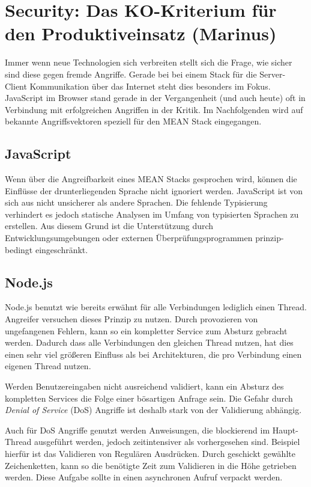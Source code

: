\chapter{Security: Das KO-Kriterium für den Produktiveinsatz
(Marinus)}\label{security-das-ko-kriterium-fuxfcr-den-produktiveinsatz-marinus}

Immer wenn neue Technologien sich verbreiten stellt sich die Frage, wie
sicher sind diese gegen fremde Angriffe. Gerade bei bei einem Stack für
die Server-Client Kommunikation über das Internet steht dies besonders
im Fokus. JavaScript im Browser stand gerade in der Vergangenheit (und
auch heute) oft in Verbindung mit erfolgreichen Angriffen in der Kritik.
Im Nachfolgenden wird auf bekannte Angriffsvektoren speziell für den
MEAN Stack eingegangen.

\section{JavaScript}\label{javascript}

Wenn über die Angreifbarkeit eines MEAN Stacks gesprochen wird, können
die Einflüsse der drunterliegenden Sprache nicht ignoriert werden.
JavaScript ist von sich aus nicht unsicherer als andere Sprachen. Die
fehlende Typisierung verhindert es jedoch statische Analysen im Umfang
von typisierten Sprachen zu erstellen. Aus diesem Grund ist die
Unterstützung durch Entwicklungsumgebungen oder externen
Überprüfungsprogrammen prinzip-bedingt eingeschränkt.

\section{Node.js}\label{node.js}

Node.js benutzt wie bereits erwähnt für alle Verbindungen lediglich
einen Thread. Angreifer versuchen dieses Prinzip zu nutzen. Durch
provozieren von ungefangenen Fehlern, kann so ein kompletter Service zum
Absturz gebracht werden. Dadurch dass alle Verbindungen den gleichen
Thread nutzen, hat dies einen sehr viel größeren Einfluss als bei
Architekturen, die pro Verbindung einen eigenen Thread nutzen.

Werden Benutzereingaben nicht ausreichend validiert, kann ein Absturz
des kompletten Services die Folge einer bösartigen Anfrage sein. Die
Gefahr durch \emph{Denial of Service} (DoS) Angriffe ist deshalb stark von
der Validierung abhängig.

Auch für DoS Angriffe genutzt werden Anweisungen, die blockierend im
Haupt-Thread ausgeführt werden, jedoch zeitintensiver als vorhergesehen
sind. Beispiel hierfür ist das Validieren von Regulären Ausdrücken.
Durch geschickt gewählte Zeichenketten, kann so die benötigte Zeit zum
Validieren in die Höhe getrieben werden. Diese Aufgabe sollte in einen
asynchronen Aufruf verpackt werden.

